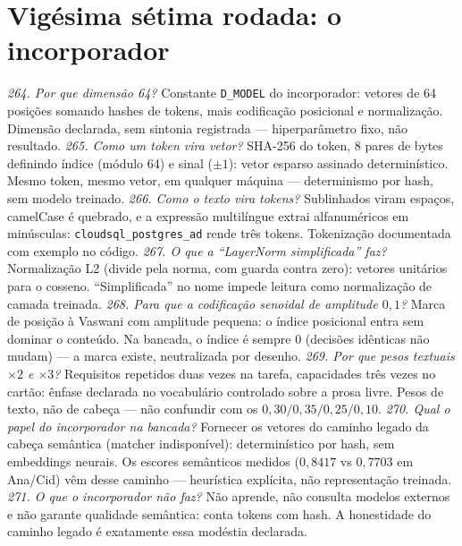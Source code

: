 \section{Vigésima sétima rodada: o incorporador}
\textit{264. Por que dimensão 64?} Constante \texttt{D\_MODEL} do incorporador: vetores de 64 posições somando hashes de tokens, mais codificação posicional e normalização. Dimensão declarada, sem sintonia registrada --- hiperparâmetro fixo, não resultado.
\textit{265. Como um token vira vetor?} SHA-256 do token, 8 pares de bytes definindo índice (módulo 64) e sinal ($\pm1$): vetor esparso assinado determinístico. Mesmo token, mesmo vetor, em qualquer máquina --- determinismo por hash, sem modelo treinado.
\textit{266. Como o texto vira tokens?} Sublinhados viram espaços, camelCase é quebrado, e a expressão multilíngue extrai alfanuméricos em minúsculas: \texttt{cloudsql\_postgres\_ad} rende três tokens. Tokenização documentada com exemplo no código.
\textit{267. O que a ``LayerNorm simplificada'' faz?} Normalização L2 (divide pela norma, com guarda contra zero): vetores unitários para o cosseno. ``Simplificada'' no nome impede leitura como normalização de camada treinada.
\textit{268. Para que a codificação senoidal de amplitude $0{,}1$?} Marca de posição à Vaswani com amplitude pequena: o índice posicional entra sem dominar o conteúdo. Na bancada, o índice é sempre 0 (decisões idênticas não mudam) --- a marca existe, neutralizada por desenho.
\textit{269. Por que pesos textuais $\times2$ e $\times3$?} Requisitos repetidos duas vezes na tarefa, capacidades três vezes no cartão: ênfase declarada no vocabulário controlado sobre a prosa livre. Pesos de texto, não de cabeça --- não confundir com os $0{,}30/0{,}35/0{,}25/0{,}10$.
\textit{270. Qual o papel do incorporador na bancada?} Fornecer os vetores do caminho legado da cabeça semântica (matcher indisponível): determinístico por hash, sem embeddings neurais. Os escores semânticos medidos ($0{,}8417$ vs $0{,}7703$ em Ana/Cid) vêm desse caminho --- heurística explícita, não representação treinada.
\textit{271. O que o incorporador não faz?} Não aprende, não consulta modelos externos e não garante qualidade semântica: conta tokens com hash. A honestidade do caminho legado é exatamente essa modéstia declarada.
